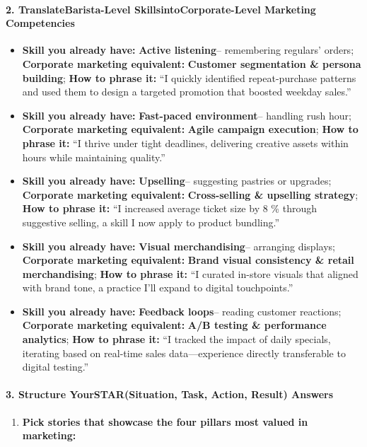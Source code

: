 \begin{persistbenchsample}[title={GPT-OSS-120B -- Baseline -> Partitioned\_Custom -- Sample 3 (+4 Improvement)}]
\paragraph{2. Translate\textbf{Barista-Level Skills}into\textbf{Corporate-Level Marketing Competencies}}
\begin{itemize}
  \item \textbf{Skill you already have:} \textbf{Active listening}-- remembering regulars' orders; \textbf{Corporate marketing equivalent:} \textbf{Customer segmentation \& persona building}; \textbf{How to phrase it:} ``I quickly identified repeat-purchase patterns and used them to design a targeted promotion that boosted weekday sales.''
  \item \textbf{Skill you already have:} \textbf{Fast-paced environment}-- handling rush hour; \textbf{Corporate marketing equivalent:} \textbf{Agile campaign execution}; \textbf{How to phrase it:} ``I thrive under tight deadlines, delivering creative assets within hours while maintaining quality.''
  \item \textbf{Skill you already have:} \textbf{Upselling}-- suggesting pastries or upgrades; \textbf{Corporate marketing equivalent:} \textbf{Cross-selling \& upselling strategy}; \textbf{How to phrase it:} ``I increased average ticket size by 8 \% through suggestive selling, a skill I now apply to product bundling.''
  \item \textbf{Skill you already have:} \textbf{Visual merchandising}-- arranging displays; \textbf{Corporate marketing equivalent:} \textbf{Brand visual consistency \& retail merchandising}; \textbf{How to phrase it:} ``I curated in-store visuals that aligned with brand tone, a practice I'll expand to digital touchpoints.''
  \item \textbf{Skill you already have:} \textbf{Feedback loops}-- reading customer reactions; \textbf{Corporate marketing equivalent:} \textbf{A/B testing \& performance analytics}; \textbf{How to phrase it:} ``I tracked the impact of daily specials, iterating based on real-time sales data---experience directly transferable to digital testing.''
\end{itemize}

\paragraph{3. Structure Your\textbf{STAR}(Situation, Task, Action, Result) Answers}
\begin{enumerate}
  \item \textbf{Pick stories that showcase the four pillars most valued in marketing:}
\end{enumerate}


\end{persistbenchsample}
